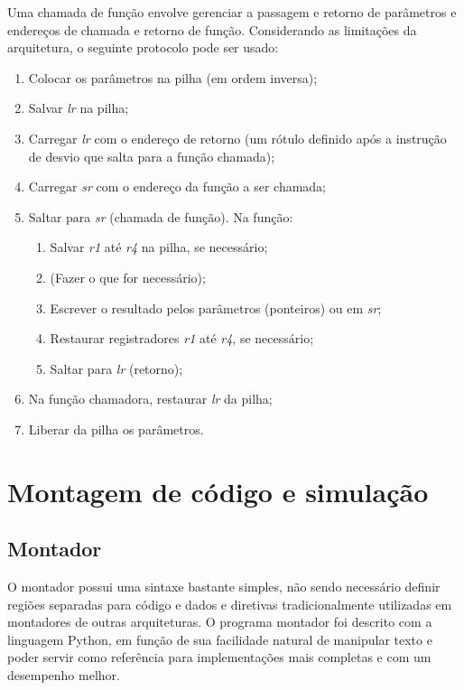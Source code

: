 \documentclass{extreport}
\begin{document}
Uma chamada de função envolve gerenciar a passagem e retorno de parâmetros e endereços de chamada e retorno de função. Considerando as limitações da arquitetura, o seguinte protocolo pode ser usado:

\begin{enumerate}
\item Colocar os parâmetros na pilha (em ordem inversa);
\item Salvar \textit{lr} na pilha;
\item Carregar \textit{lr} com o endereço de retorno (um rótulo definido após a instrução de desvio que salta para a função chamada);
\item Carregar \textit{sr} com o endereço da função a ser chamada;
\item Saltar para \textit{sr} (chamada de função). Na função:
	\begin{enumerate}
	\item Salvar \textit{r1} até \textit{r4} na pilha, se necessário;
	\item (Fazer o que for necessário);
	\item Escrever o resultado pelos parâmetros (ponteiros) ou em \textit{sr};
	\item Restaurar registradores \textit{r1} até \textit{r4}, se necessário;
	\item Saltar para \textit{lr} (retorno);
	\end{enumerate}
\item Na função chamadora, restaurar \textit{lr} da pilha;
\item Liberar da pilha os parâmetros.
\end{enumerate}


\chapter{Montagem de código e simulação}
\label{ref:assembler}

\section{Montador}
O montador possui uma sintaxe bastante simples, não sendo necessário definir regiões separadas para código e dados e diretivas tradicionalmente utilizadas em montadores de outras arquiteturas. O programa montador foi descrito com a linguagem Python, em função de sua facilidade natural de manipular texto e poder servir como referência para implementações mais completas e com um desempenho melhor.
\end{document}
